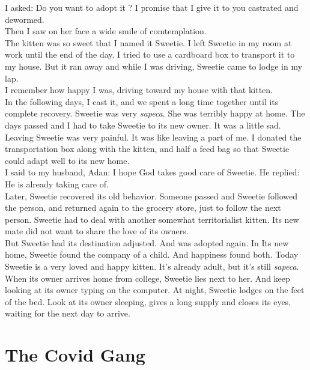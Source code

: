 \documentclass[11pt]{book}
\begin{document}
\noindent I asked: Do you want to adopt it ? I promise that I give it to you castrated and dewormed. \\

\noindent Then I saw on her face a wide smile of comtemplation. \\

\noindent The kitten was so sweet that I named it Sweetie. I left Sweetie in my room at work until the end of the day. I tried to use a cardboard box to transport it to my house. But it ran away and while I was driving, Sweetie came to lodge in my lap. \\

\noindent I remember how happy I was, driving toward my house with that kitten. \\

\noindent In the following days, I cast it, and we spent a long time together until its complete recovery. Sweetie was very \emph {sapeca}. She was terribly happy at home. The days passed and I had to take Sweetie to its new owner. It was a little sad. Leaving Sweetie was very painful. It was like leaving a part of me. I donated the transportation box along with the kitten, and half a feed bag so that Sweetie could adapt well to its new home. \\

\noindent I said to my husband, Adan: I hope God takes good care of Sweetie. He replied: He is already taking care of. \\

\noindent Later, Sweetie recovered its old behavior. Someone passed and Sweetie followed the person, and returned again to the grocery store, just to follow the next person. Sweetie had to deal with another somewhat territorialist kitten. Its new mate did not want to share the love of its owners. \\

\noindent But Sweetie had its destination adjusted. And was adopted again. In Its new home, Sweetie found the company of a child. And happiness found both. Today Sweetie is a very loved and happy kitten. It's already adult, but it's still \emph{sapeca}. When its owner arrives home from college, Sweetie lies next to her. And keep looking at its owner typing on the computer. At night, Sweetie lodges on the feet of the bed. Look at its owner sleeping, gives a long supply and closes its eyes, waiting for the next day to arrive. \\

\chapter{The Covid Gang}
\end{document}
